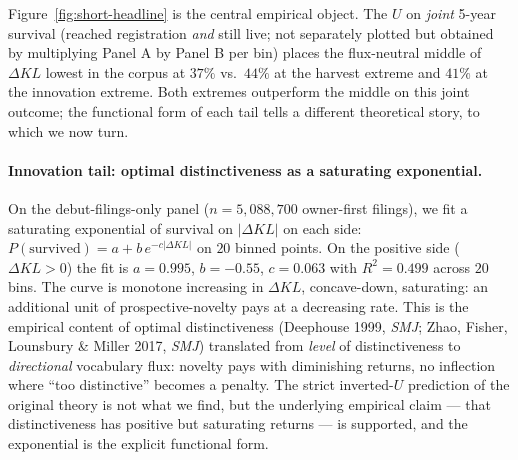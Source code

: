 \documentclass[11pt]{article}
\begin{document}
Figure~\ref{fig:short-headline} is the central empirical object.
The $U$ on \emph{joint} 5-year survival (reached registration
\emph{and} still live; not separately plotted but obtained by
multiplying Panel A by Panel B per bin) places the flux-neutral
middle of $\Delta KL$ lowest in the corpus at $37\%$ vs.\ $44\%$ at
the harvest extreme and $41\%$ at the innovation extreme. Both
extremes outperform the middle on this joint outcome; the
functional form of each tail tells a different theoretical story,
to which we now turn.

\paragraph{Innovation tail: optimal distinctiveness as a saturating
exponential.} On the debut-filings-only panel ($n = 5{,}088{,}700$
owner-first filings), we fit a saturating exponential of survival on
$|\Delta KL|$ on each side: $P(\text{survived}) = a +
b\,e^{-c|\Delta KL|}$ on $20$ binned points. On the positive side
($\Delta KL > 0$) the fit is $a = 0.995$, $b = -0.55$, $c = 0.063$
with $R^2 = 0.499$ across $20$ bins. The curve is monotone increasing
in $\Delta KL$, concave-down, saturating: an additional unit of
prospective-novelty pays at a decreasing rate. This is the empirical
content of optimal distinctiveness (Deephouse 1999, \emph{SMJ}; Zhao,
Fisher, Lounsbury \& Miller 2017, \emph{SMJ}) translated from
\emph{level} of distinctiveness to \emph{directional} vocabulary
flux: novelty pays with diminishing returns, no inflection where
``too distinctive'' becomes a penalty. The strict inverted-$U$
prediction of the original theory is not what we find, but the
underlying empirical claim --- that distinctiveness has positive but
saturating returns --- is supported, and the exponential is the
explicit functional form.
\end{document}
